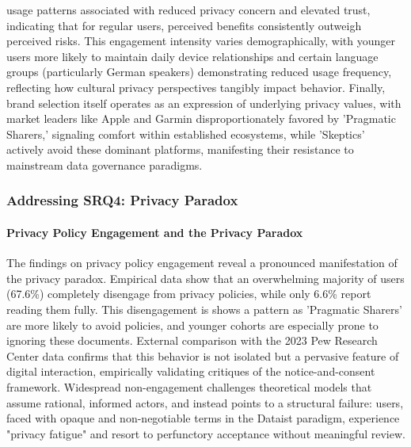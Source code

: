 usage patterns associated with reduced privacy concern and elevated trust, indicating that for regular users, perceived benefits consistently outweigh perceived risks. This engagement intensity varies demographically, with younger users more likely to maintain daily device relationships and certain language groups (particularly German speakers) demonstrating reduced usage frequency, reflecting how cultural privacy perspectives tangibly impact behavior. Finally, brand selection itself operates as an expression of underlying privacy values, with market leaders like Apple and Garmin disproportionately favored by 'Pragmatic Sharers,' signaling comfort within established ecosystems, while 'Skeptics' actively avoid these dominant platforms, manifesting their resistance to mainstream data governance paradigms.
	\subsubsection{Addressing SRQ4: Privacy Paradox}

	\paragraph{Privacy Policy Engagement and the Privacy Paradox}
	The findings on privacy policy engagement reveal a pronounced manifestation of the privacy paradox. Empirical data show that an overwhelming majority of users (67.6\%) completely disengage from privacy policies, while only 6.6\% report reading them fully. This disengagement is shows a pattern as 'Pragmatic Sharers' are more likely to avoid policies, and younger cohorts are especially prone to ignoring these documents.
	External comparison with the 2023 Pew Research Center data confirms that this behavior is not isolated but a pervasive feature of digital interaction, empirically validating critiques of the notice-and-consent framework. Widespread non-engagement challenges theoretical models that assume rational, informed actors, and instead points to a structural failure: users, faced with opaque and non-negotiable terms in the Dataist paradigm, experience "privacy fatigue" and resort to perfunctory acceptance without meaningful review.

